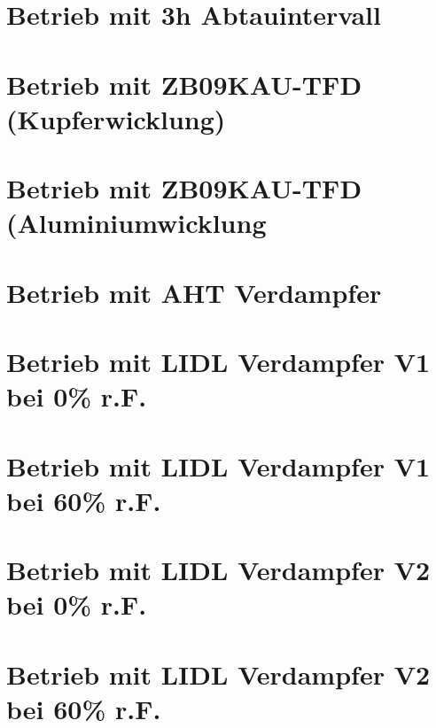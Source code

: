 \section{Betrieb mit 3h Abtauintervall}

\section{Betrieb mit ZB09KAU-TFD (Kupferwicklung)}

\section{Betrieb mit ZB09KAU-TFD (Aluminiumwicklung}

\section{Betrieb mit AHT Verdampfer}

\section{Betrieb mit LIDL Verdampfer V1 bei 0\% r.F.}

\section{Betrieb mit LIDL Verdampfer V1 bei 60\% r.F.}

\section{Betrieb mit LIDL Verdampfer V2 bei 0\% r.F.}

\section{Betrieb mit LIDL Verdampfer V2 bei 60\% r.F.}
